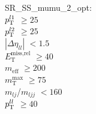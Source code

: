 SR\_SS\_mumu\_2\_opt: \\
$p_{\text{T}}^{l1}$ $\geq 25$ \\
$p_{\text{T}}^{l2}$ $\geq 25$ \\
$|\Delta\eta_{ll}|$ $<1.5$ \\
$E_{\text{T}}^{\text{miss,rel}}$ $\geq 40$ \\
$m_{\text{eff}}$ $\geq 200$ \\
$m_{\text{T}}^{\text{max}}$ $\geq 75$ \\
$m_{lj}$/$m_{ljj}$ $<160$ \\
$p_{\text{T}}^{ll}$ $\geq 40$ \\
